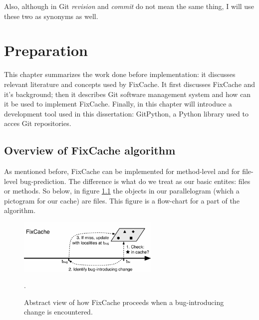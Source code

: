 \documentclass[12pt,twoside,notitlepage]{report}
\newcommand{\fxch}{FixCache}
\begin{document}
Also, although in Git \textit{revision} and \textit{commit} do not mean the same thing, I will use these two as synonyms as well.
\cleardoublepage
\chapter{Preparation}
This chapter summarizes the work done before implementation: it discusses relevant literature and concepts used by \fxch{}. It first discusses \fxch{} and it's background; then it describes Git\cite{TorvaldsGit} software management system and how can it be used to implement \fxch{}. Finally, in this chapter will introduce a development tool used in this dissertation: GitPython, a Python library used to acces Git repositories.
\section{Overview of \fxch{} algorithm}
As mentioned before, 
\fxch{} can be implemented for method-level and for file-level bug-prediction\cite{FixCache}. The difference is what do we treat as our basic entites: files or methods. So below, in figure \ref{fixcache_figure} the objects in our parallelogram (which a pictogram for our cache) are files. This figure is a flow-chart for a part of the algorithm.
\begin{figure}[h]
\includegraphics[width=0.6\textwidth]{fixcache_figure.png}
\centering
\captionsetup{width=0.6\textwidth}
\caption{Abstract view of how \fxch{} proceeds when a bug-introducing change is encountered.}.
\label{fixcache_figure}
\end{figure}
\end{document}
